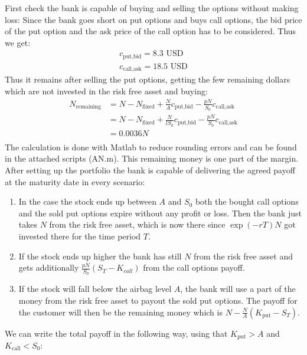\documentclass[11pt,oneside,a4paper]{article}
\begin{document}
	First check the bank is capable of buying and selling the options without making loss:
	Since the bank goes short on put options and buys call options, the bid price of the put option and the ask price of the call option has to be considered. Thus we get:
	\begin{align*}
	    c_{\text{put,bid}} = 8.3 \text{ USD}  \\
		c_{\text{call,ask}} = 18.5 \text{ USD}  
	\end{align*}
	Thus it remains after selling the put options, getting the few remaining dollars which are not invested in the risk free asset and buying:
	\begin{align*}
		N_{\text{remaining}}  &= N - N_{\text{fixed}} + \frac{N}{A}c_{\text{put,bid}} - \frac{pN}{S_0} c_{\text{call,ask}} \\
		&= N - N_{\text{fixed}} + \frac{N}{lS_0}c_{\text{put,bid}} - \frac{pN}{S_0} c_{\text{call,ask}} \\
		&= 0.0036N \\ 
	\end{align*}
	The calculation is done with Matlab to reduce rounding errors and can be found in the attached scripts (AN.m). This remaining money is one part of the margin.
	After setting up the portfolio the bank is capable of delivering the agreed payoff at the maturity date in every scenario:
	\begin{enumerate}
		\item In the case the stock ends up between $ A $ and $ S_0 $ both the bought call options and the sold put options expire without any profit or loss. Then the bank just takes $ N $ from the risk free asset, which is now there since $ \exp(-rT)N $ got invested there for the time period $ T $.
		\item If the stock ends up higher the bank has still $ N $ from the risk free asset and gets additionally $ \frac{pN}{S_0} (S_T- K_{call})$ from the call options payoff.
		\item If the stock will fall below the airbag level $ A $, the bank will use a part of the money from the risk free asset to payout the sold put options. The payoff for the customer will then be the remaining money which is $ N - \frac{N}{A}(K_{\text{put}}-S_T) $.
	\end{enumerate}
	We can write the total payoff in the following way, using that $ K_{\text{put}} > A $ and $ K_{\text{call}} < S_0 $:
\end{document}
